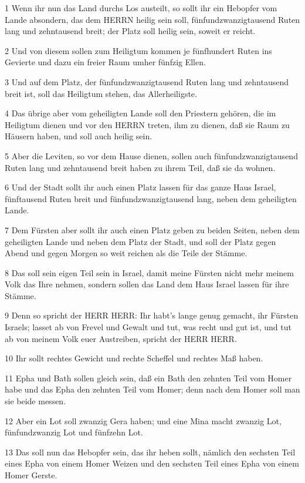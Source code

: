 \par 1 Wenn ihr nun das Land durchs Los austeilt, so sollt ihr ein Hebopfer vom Lande absondern, das dem HERRN heilig sein soll, fünfundzwanzigtausend Ruten lang und zehntausend breit; der Platz soll heilig sein, soweit er reicht.
\par 2 Und von diesem sollen zum Heiligtum kommen je fünfhundert Ruten ins Gevierte und dazu ein freier Raum umher fünfzig Ellen.
\par 3 Und auf dem Platz, der fünfundzwanzigtausend Ruten lang und zehntausend breit ist, soll das Heiligtum stehen, das Allerheiligste.
\par 4 Das übrige aber vom geheiligten Lande soll den Priestern gehören, die im Heiligtum dienen und vor den HERRN treten, ihm zu dienen, daß sie Raum zu Häusern haben, und soll auch heilig sein.
\par 5 Aber die Leviten, so vor dem Hause dienen, sollen auch fünfundzwanzigtausend Ruten lang und zehntausend breit haben zu ihrem Teil, daß sie da wohnen.
\par 6 Und der Stadt sollt ihr auch einen Platz lassen für das ganze Haus Israel, fünftausend Ruten breit und fünfundzwanzigtausend lang, neben dem geheiligten Lande.
\par 7 Dem Fürsten aber sollt ihr auch einen Platz geben zu beiden Seiten, neben dem geheiligten Lande und neben dem Platz der Stadt, und soll der Platz gegen Abend und gegen Morgen so weit reichen als die Teile der Stämme.
\par 8 Das soll sein eigen Teil sein in Israel, damit meine Fürsten nicht mehr meinem Volk das Ihre nehmen, sondern sollen das Land dem Haus Israel lassen für ihre Stämme.
\par 9 Denn so spricht der HERR HERR: Ihr habt's lange genug gemacht, ihr Fürsten Israels; lasset ab von Frevel und Gewalt und tut, was recht und gut ist, und tut ab von meinem Volk euer Austreiben, spricht der HERR HERR.
\par 10 Ihr sollt rechtes Gewicht und rechte Scheffel und rechtes Maß haben.
\par 11 Epha und Bath sollen gleich sein, daß ein Bath den zehnten Teil vom Homer habe und das Epha den zehnten Teil vom Homer; denn nach dem Homer soll man sie beide messen.
\par 12 Aber ein Lot soll zwanzig Gera haben; und eine Mina macht zwanzig Lot, fünfundzwanzig Lot und fünfzehn Lot.
\par 13 Das soll nun das Hebopfer sein, das ihr heben sollt, nämlich den sechsten Teil eines Epha von einem Homer Weizen und den sechsten Teil eines Epha von einem Homer Gerste.

